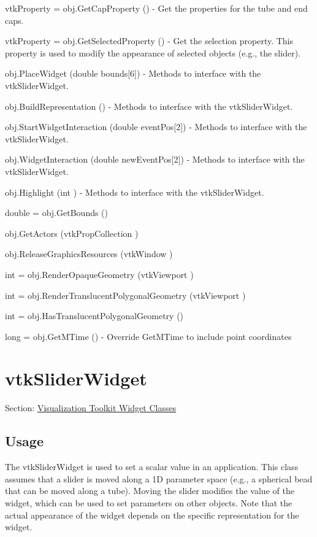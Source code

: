 \begin{DoxyItemize}
\item {\ttfamily vtk\-Property = obj.\-Get\-Cap\-Property ()} -\/ Get the properties for the tube and end caps.  
\item {\ttfamily vtk\-Property = obj.\-Get\-Selected\-Property ()} -\/ Get the selection property. This property is used to modify the appearance of selected objects (e.\-g., the slider).  
\item {\ttfamily obj.\-Place\-Widget (double bounds\mbox{[}6\mbox{]})} -\/ Methods to interface with the vtk\-Slider\-Widget.  
\item {\ttfamily obj.\-Build\-Representation ()} -\/ Methods to interface with the vtk\-Slider\-Widget.  
\item {\ttfamily obj.\-Start\-Widget\-Interaction (double event\-Pos\mbox{[}2\mbox{]})} -\/ Methods to interface with the vtk\-Slider\-Widget.  
\item {\ttfamily obj.\-Widget\-Interaction (double new\-Event\-Pos\mbox{[}2\mbox{]})} -\/ Methods to interface with the vtk\-Slider\-Widget.  
\item {\ttfamily obj.\-Highlight (int )} -\/ Methods to interface with the vtk\-Slider\-Widget.  
\item {\ttfamily double = obj.\-Get\-Bounds ()}  
\item {\ttfamily obj.\-Get\-Actors (vtk\-Prop\-Collection )}  
\item {\ttfamily obj.\-Release\-Graphics\-Resources (vtk\-Window )}  
\item {\ttfamily int = obj.\-Render\-Opaque\-Geometry (vtk\-Viewport )}  
\item {\ttfamily int = obj.\-Render\-Translucent\-Polygonal\-Geometry (vtk\-Viewport )}  
\item {\ttfamily int = obj.\-Has\-Translucent\-Polygonal\-Geometry ()}  
\item {\ttfamily long = obj.\-Get\-M\-Time ()} -\/ Override Get\-M\-Time to include point coordinates  
\end{DoxyItemize}\hypertarget{vtkwidgets_vtksliderwidget}{}\section{vtk\-Slider\-Widget}\label{vtkwidgets_vtksliderwidget}
Section\-: \hyperlink{sec_vtkwidgets}{Visualization Toolkit Widget Classes} \hypertarget{vtkwidgets_vtkxyplotwidget_Usage}{}\subsection{Usage}\label{vtkwidgets_vtkxyplotwidget_Usage}
The vtk\-Slider\-Widget is used to set a scalar value in an application. This class assumes that a slider is moved along a 1\-D parameter space (e.\-g., a spherical bead that can be moved along a tube). Moving the slider modifies the value of the widget, which can be used to set parameters on other objects. Note that the actual appearance of the widget depends on the specific representation for the widget.

